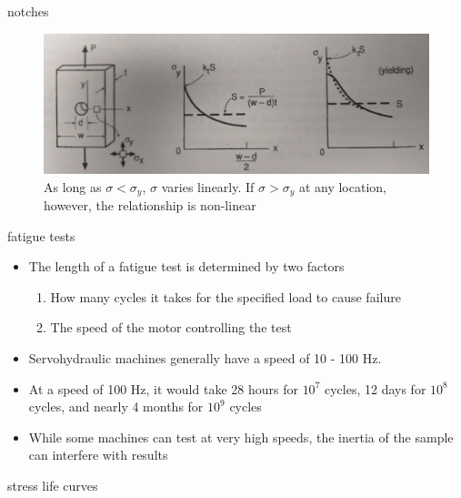 \documentclass[10pt]{beamer}
\begin{document}
\begin{frame}{notches}
	\begin{figure}
	\centering
	\includegraphics[width=0.7\linewidth]{../Figures/p232-c}
	\caption{As long as $\sigma < \sigma_y$, $\sigma$ varies linearly. If $\sigma > \sigma_y$ at any location, however, the relationship is non-linear}
	\label{fig:p232-c}
	\end{figure}
\end{frame}

\begin{frame}{fatigue tests}
	\begin{itemize}[<+->]
		\item The length of a fatigue test is determined by two factors
		\begin{enumerate}
			\item How many cycles it takes for the specified load to cause failure
			\item The speed of the motor controlling the test
		\end{enumerate}
		\item Servohydraulic machines generally have a speed of 10 - 100 Hz.
		\item At a speed of 100 Hz, it would take 28 hours for $10^7$ cycles, 12 days for $10^8$ cycles, and nearly 4 months for $10^9$ cycles
		\item While some machines can test at very high speeds, the inertia of the sample can interfere with results
	\end{itemize}
\end{frame}

\begin{frame}{stress life curves}
\end{frame}
\end{document}
